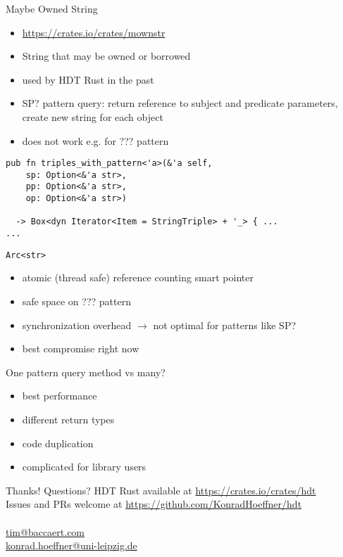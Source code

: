 \documentclass[14pt,aspectratio=169]{beamer}
\newcommand\pro{\item[$+$]}
\newcommand\con{\item[$-$]}
\begin{document}
\begin{frame}[fragile]{Maybe Owned String}
\begin{itemize}
\item \url{https://crates.io/crates/mownstr}
\item String that may be owned or borrowed
\item used by HDT Rust in the past
\pro SP? pattern query: return reference to subject and predicate parameters, create new string for each object
\con does not work e.g. for ??? pattern
\end{itemize}
\small
\begin{verbatim}
pub fn triples_with_pattern<'a>(&'a self,
    sp: Option<&'a str>,
    pp: Option<&'a str>,
    op: Option<&'a str>)

  -> Box<dyn Iterator<Item = StringTriple> + '_> { ...
...
\end{verbatim}
\end{frame}

\begin{frame}[fragile]{\texttt{Arc<str>}}
\begin{itemize}
\item atomic (thread safe) reference counting smart pointer
\pro safe space on ??? pattern
\con synchronization overhead $\rightarrow$ not optimal for patterns like SP?
\item best compromise right now
\end{itemize}
\end{frame}

\begin{frame}[fragile]{One pattern query method vs many?}
\begin{itemize}
\pro best performance
\con different return types
\con code duplication
\con complicated for library users
\end{itemize}
\end{frame}

\iffalse
\begin{frame}{Conclusions}
\begin{itemize}
\item Rust great fit for stable and performant Semantic Web tooling
\end{itemize}
\end{frame}
\fi

\begin{frame}[fragile]{Thanks! Questions?}
\centering
HDT Rust available at \url{https://crates.io/crates/hdt}\\
Issues and PRs welcome at \url{https://github.com/KonradHoeffner/hdt}\\
~\\
\url{tim@baccaert.com}\\
\url{konrad.hoeffner@uni-leipzig.de}\\
\end{frame}
\end{document}
